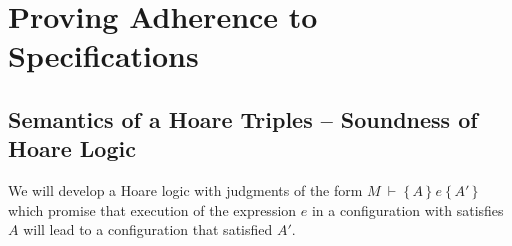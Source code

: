 \section{Proving Adherence to \SpecLang Specifications}

\subsection{Semantics of  a Hoare Triples -- Soundness of Hoare Logic}

We will develop a  Hoare logic with judgments of the form  $M\ \vdash\  \{\, A \,  \}\ e\  \{\, A' \, \}$ which promise that execution of the expression $e$ in a configuration with satisfies $A$ will lead to a configuration that satisfied $A'$. 
%
%
%

